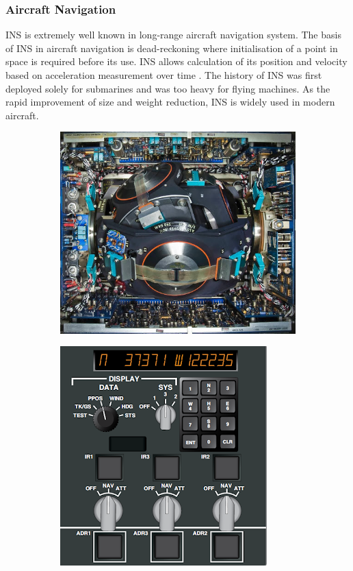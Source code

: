 \subsubsection{Aircraft Navigation}
INS is extremely well known in long-range aircraft navigation system. The basis of INS in aircraft navigation is dead-reckoning where initialisation of a point in space is required before its use. INS allows calculation of its position and velocity based on acceleration measurement over time \cite{El-Sheimy2020InertialTrends} \cite{Loewy2003AircraftAvionics}. The history of INS was first deployed solely for submarines and was too heavy for flying machines. As the rapid improvement of size and weight reduction, INS is widely used in modern aircraft.

\begin{figure}[!ht]
\begin{center}
%    
  \begin{subfigure}[b]{0.5\textwidth}
    \includegraphics[scale=0.4]{Figures/INS_Concorde.jpg}
  \end{subfigure}
  \begin{subfigure}[b]{0.45\textwidth}
    \includegraphics[scale=0.5]{Figures/INS-IRS_InterfacePanel.png}

\end{subfigure}
\end{center}
\end{figure}
